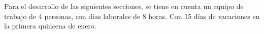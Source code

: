 
Para el desarrollo de las siguientes secciones, se tiene en cuenta un equipo de trabajo de 4 personas, con días laborales de 8 horas. Con 15 días de vacaciones en la primera quincena de enero.









%